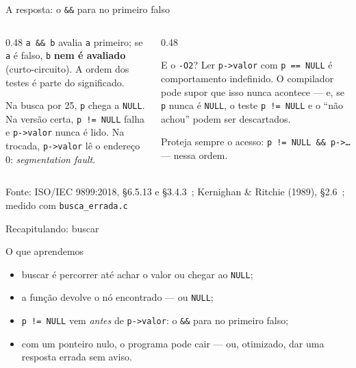 \documentclass[aspectratio=169]{beamer}
\newcommand{\fonte}[1]{\vfill\hfill{\scriptsize\textcolor{UFSGray}{Fonte: #1}}}
\begin{document}
\begin{frame}{A resposta: o \texttt{\&\&} para no primeiro falso}
  \begin{columns}[T]
    \begin{column}{0.48\textwidth}
      \small
      \texttt{a \&\& b} avalia \texttt{a} primeiro; se \texttt{a} é falso,
      \texttt{b} \textbf{nem é avaliado} (curto-circuito). A ordem dos
      testes é parte do significado.

      \medskip
      Na busca por 25, \texttt{p} chega a \texttt{NULL}. Na versão certa,
      \texttt{p != NULL} falha e \texttt{p->valor} nunca é lido. Na
      trocada, \texttt{p->valor} lê o endereço 0: \emph{segmentation
      fault}.
    \end{column}
    \begin{column}{0.48\textwidth}
      \begin{alertblock}{E o \texttt{-O2}?}
        \small Ler \texttt{p->valor} com \texttt{p == NULL} é comportamento
        indefinido. O compilador pode supor que isso nunca acontece --- e,
        se \texttt{p} nunca é \texttt{NULL}, o teste \texttt{p != NULL} e o
        ``não achou'' podem ser descartados.
      \end{alertblock}
      \small Proteja sempre o acesso: \texttt{p != NULL \&\&
      p->\ldots} --- nessa ordem.
    \end{column}
  \end{columns}
  \fonte{ISO/IEC 9899:2018, §6.5.13 e §3.4.3~\cite{iso2018c17};
    Kernighan \& Ritchie (1989), §2.6~\cite{kernighan1989c};
    medido com \texttt{busca\_errada.c}}
\end{frame}

\begin{frame}{Recapitulando: buscar}
  \begin{block}{O que aprendemos}
    \begin{itemize}
      \item buscar é percorrer até achar o valor ou chegar ao \texttt{NULL};
      \item a função devolve o nó encontrado --- ou \texttt{NULL};
      \item \texttt{p != NULL} vem \emph{antes} de \texttt{p->valor}: o
        \texttt{\&\&} para no primeiro falso;
      \item com um ponteiro nulo, o programa pode cair --- ou, otimizado,
        dar uma resposta errada sem aviso.
    \end{itemize}
  \end{block}
\end{frame}
\end{document}
